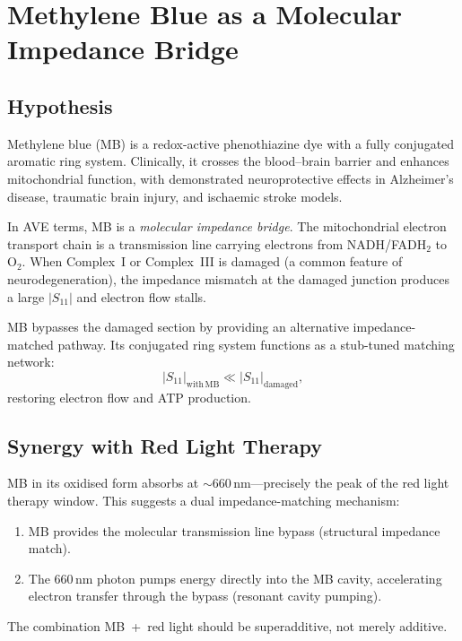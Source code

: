 \section{Methylene Blue as a Molecular Impedance Bridge}
\label{sec:methylene_blue}

\subsection{Hypothesis}

Methylene blue (MB) is a redox-active phenothiazine dye with a
fully conjugated aromatic ring system.  Clinically, it crosses the
blood--brain barrier and enhances mitochondrial function, with
demonstrated neuroprotective effects in Alzheimer's disease,
traumatic brain injury, and ischaemic stroke models.

In AVE terms, MB is a \emph{molecular impedance bridge}.  The
mitochondrial electron transport chain is a transmission line
carrying electrons from NADH/FADH$_2$ to O$_2$.  When Complex~I
or Complex~III is damaged (a common feature of neurodegeneration),
the impedance mismatch at the damaged junction produces a large
$|S_{11}|$ and electron flow stalls.

MB bypasses the damaged section by providing an alternative
impedance-matched pathway.  Its conjugated ring system functions as
a stub-tuned matching network:
\begin{equation}
  |S_{11}|_{\mathrm{with\,MB}} \ll |S_{11}|_{\mathrm{damaged}},
\end{equation}
restoring electron flow and ATP production.

\subsection{Synergy with Red Light Therapy}

MB in its oxidised form absorbs at $\sim$660\,nm---precisely the
peak of the red light therapy window.  This suggests a dual
impedance-matching mechanism:
\begin{enumerate}
  \item MB provides the molecular transmission line bypass
        (structural impedance match).
  \item The 660\,nm photon pumps energy directly into the MB
        cavity, accelerating electron transfer through the bypass
        (resonant cavity pumping).
\end{enumerate}
The combination MB~+~red light should be superadditive, not merely
additive.

